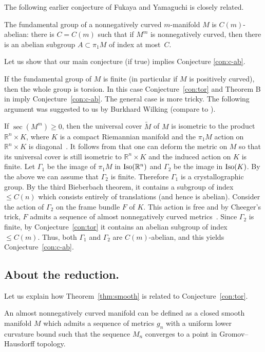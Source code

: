 \documentclass{amsart}
\begin{document}
The following earlier conjecture of Fukaya and Yamaguchi \cite{FY} is closely related.

\begin{conj}\label{con:c-ab}
The fundamental group of a nonnegatively curved  $m$-manifold $M$ is $C(m)$-abelian: 
there is $C=C(m)$ such that if $M^m$ is nonnegatively curved, then there is an 
abelian subgroup $A\subset \pi_1M$ of index  at most~$C$.
\end{conj}

Let us show that our main conjecture (if true) implies Conjecture \ref{con:c-ab}.

If the fundamental group of $M$ is finite (in particular if $M$ is positively curved), then the whole group is torsion.
In this case Conjecture~\ref{con:tor} and Theorem B in \cite{KPT} imply Conjecture~\ref{con:c-ab}.
The general case is more tricky.
The following argument
was suggested to us by Burkhard Wilking (compare to \cite[Corollary 4.6.1]{KPT}).

If $\sec(M^m)\ge0$, then the universal cover $\tilde M$ of $M$ is isometric to the product $\mathbb{R}^n\times K$, where $K$ is a compact Riemannian manifold and the $\pi_1M$ action  on $\mathbb{R}^n\times K$ is diagonal~\cite{CG72}.
It follows from \cite[Cor. 6.3]{wilking} that one can deform the metric on $M$ so that its universal cover is still isometric to $\mathbb{R}^n\times K$ and the induced action on $K$ is finite.
Let $\Gamma_1$ be the image of $\pi_1M$ in $\mathop{\rm Iso}(\mathbb{R}^n)$ and $\Gamma_2$ be the image in $\mathop{\rm Iso}(K)$. By the above we can assume that $\Gamma_2$ is finite.
Therefore $\Gamma_1$ is a crystallographic group.
By the third Bieberbach theorem, it contains a subgroup of index $\le C(n)$ which consists entirely of translations (and hence is abelian).
Consider the action of $\Gamma_2$ on the frame bundle $F$ of $K$.
This action is free and by Cheeger's trick, $F$ admits a sequence of almost nonnegatively curved metrics~\cite{FY}. 
Since $\Gamma_2$ is finite, by Conjecture~\ref{con:tor} it contains 
an abelian subgroup of index $\le C(m)$. 
Thus, both $\Gamma_1$ and $\Gamma_2$ are $C(m)$-abelian,
and this yields Conjecture~\ref{con:c-ab}.

\subsection{About the reduction.} Let us explain  how Theorem~\ref{thm:smooth} is related to Conjecture~\ref{con:tor}.

An almost nonnegatively curved manifold can be defined as a closed smooth manifold $M$ which admits a sequence of metrics $g_n$ with a uniform lower curvature bound such that the sequence $M_n$ converges to a point in Gromov--Hausdorff topology.
\end{document}
